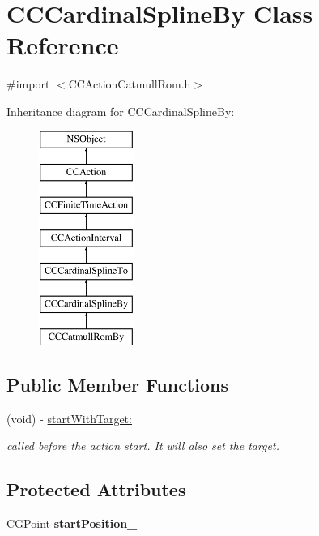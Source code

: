 \hypertarget{interface_c_c_cardinal_spline_by}{\section{C\-C\-Cardinal\-Spline\-By Class Reference}
\label{interface_c_c_cardinal_spline_by}
}


{\ttfamily \#import $<$C\-C\-Action\-Catmull\-Rom.\-h$>$}

Inheritance diagram for C\-C\-Cardinal\-Spline\-By\-:\begin{figure}[H]
\begin{center}
\leavevmode
\includegraphics[height=7.000000cm]{interface_c_c_cardinal_spline_by}
\end{center}
\end{figure}
\subsection*{Public Member Functions}
\begin{DoxyCompactItemize}
\item 
\hypertarget{interface_c_c_cardinal_spline_by_ac2a1fe5fcc59bcb620efbdaa3d5aa3fe}{(void) -\/ \hyperlink{interface_c_c_cardinal_spline_by_ac2a1fe5fcc59bcb620efbdaa3d5aa3fe}{start\-With\-Target\-:}}\label{interface_c_c_cardinal_spline_by_ac2a1fe5fcc59bcb620efbdaa3d5aa3fe}

\begin{DoxyCompactList}\small\item\em called before the action start. It will also set the target. \end{DoxyCompactList}\end{DoxyCompactItemize}
\subsection*{Protected Attributes}
\begin{DoxyCompactItemize}
\item 
\hypertarget{interface_c_c_cardinal_spline_by_abdd75209f11e702e6d1b037480a9ca90}{C\-G\-Point {\bfseries start\-Position\-\_\-}}\label{interface_c_c_cardinal_spline_by_abdd75209f11e702e6d1b037480a9ca90}

\end{DoxyCompactItemize}


